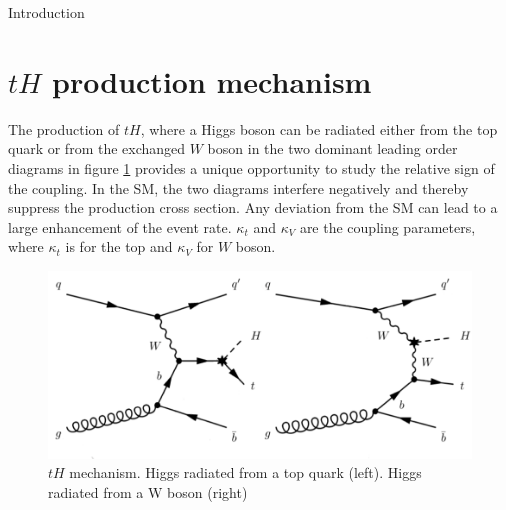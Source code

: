 \begin{chapter}{Introduction}
\section{$tH$ production mechanism}
The production of $tH$, where a Higgs boson can be radiated
either from the top quark or from the exchanged $W$ boson in the two dominant leading order
diagrams in figure \ref{newth} provides a unique opportunity to study the relative sign of the coupling.
In the SM, the two diagrams interfere negatively and thereby suppress the production cross section.
Any deviation from the SM can lead to a large enhancement of the event rate.
 $\kappa_t$ and $\kappa_V$ are the coupling parameters, where $\kappa_t$ is for the top and $\kappa_V$ for $W$ boson. 

\begin{figure}[ht]
	\centering
	\includegraphics[scale=0.5]{Chapter1/newtHq.png}
	\caption[$tH$ mechanism. Higgs radiated from a top quark (left). Higgs radiated from a W boson (right)]{$tH$ mechanism. Higgs radiated from a top quark (left). Higgs radiated from a W boson (right) \protect \cite{bb}} \label{newth}
\end{figure}
\pagebreak
\end{chapter}













